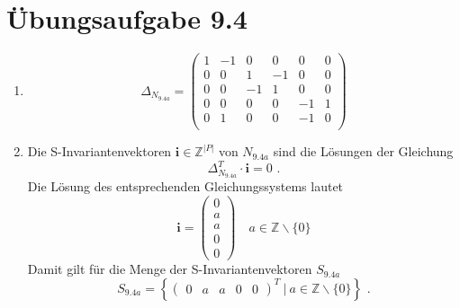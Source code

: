\documentclass[a4paper]{scrartcl}
\begin{document}
\section*{Übungsaufgabe 9.4} 
\begin{enumerate}
    \item
        \begin{equation}
            \Delta_{N_{9.4a}} =
            \begin{pmatrix}
                 1 & -1 &  0 &  0 &  0 &  0 \\
                 0 &  0 &  1 & -1 &  0 &  0 \\
                 0 &  0 & -1 &  1 &  0 &  0 \\
                 0 &  0 &  0 &  0 & -1 &  1 \\
                 0 &  1 &  0 &  0 & -1 &  0 \\
            \end{pmatrix}
        \end{equation}
        

    \item
        Die S-Invariantenvektoren $\textbf{i} \in \mathbb{Z}^{|P|}$ von $N_{9.4a}$ sind
        die Lösungen der Gleichung
        \begin{equation}
            \Delta_{N_{9.4a}}^T \cdot \textbf{i} = 0 \text{ .}
        \end{equation}
        Die Lösung des entsprechenden Gleichungssystems lautet
        \begin{equation}
            \textbf{i} =
            \begin{pmatrix}
                0 \\ a \\ a \\ 0 \\ 0
            \end{pmatrix}
            \quad
            a \in \mathbb{Z} \backslash \{ 0 \}
        \end{equation}
        Damit gilt für die Menge der S-Invariantenvektoren $S_{9.4a}$
        \begin{equation}
            S_{9.4a} = \left\{ 
                \begin{pmatrix}
                    0 & a & a & 0 & 0
                \end{pmatrix}^T
                \ \vert \ 
                a \in \mathbb{Z} \backslash \{ 0 \}
            \right\}
            \text{ .}
        \end{equation}
        

\end{enumerate}
\end{document}
